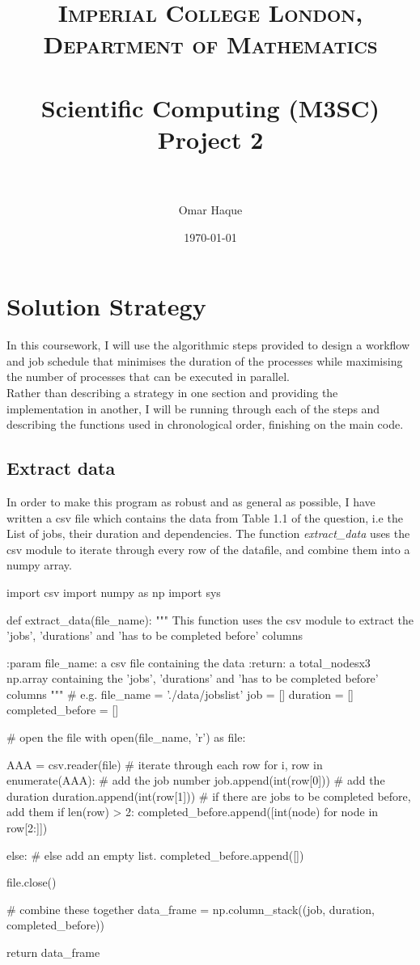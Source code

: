\documentclass[paper=a4, fontsize=12pt]{scrartcl} %
\title{
\normalfont \normalsize
\textsc{Imperial College London, Department of Mathematics} \\ [25pt]
\horrule{0.5pt} \\[0.4cm]                      %
\huge Scientific Computing (M3SC) Project 2 \\           %
\horrule{2pt} \\[0.5cm]                        %
}
\author{Omar Haque}
\date{\normalsize\today}
\numberwithin{equation}{section}       %
\numberwithin{figure}{section}         %
\numberwithin{table}{section}          %
\begin{document}

\maketitle

\section{Solution Strategy}

In this coursework, I will use the algorithmic steps provided to design a workflow and job schedule that minimises the duration of the processes while maximising the number of processes that can be executed in parallel. \\
Rather than describing a strategy in one section and providing the implementation in another, I will be running through each of the steps and describing the functions used in chronological order, finishing on the main code.
\subsection{Extract data}
In order to make this program as robust and as general as possible, I have written a csv file which contains the data from Table 1.1 of the question, i.e the List of jobs, their duration and dependencies.
The function \textit{extract\_data} uses the csv module to iterate through every row of the datafile, and combine them into a numpy array.

\begin{python} 
import csv
import numpy as np
import sys


def extract_data(file_name):
    """
    This function uses the csv module to extract the 'jobs', 'durations'
    and 'has to be completed before' columns

    :param file_name: a csv file containing the data
    :return: a total_nodesx3 np.array containing the 'jobs', 'durations'
    and 'has to be completed before' columns
    """
    # e.g. file_name = './data/jobslist'
    job = []
    duration = []
    completed_before = []

    # open the file
    with open(file_name, 'r') as file:

        AAA = csv.reader(file)
        # iterate through each row
        for i, row in enumerate(AAA):
            # add the job number
            job.append(int(row[0]))
            # add the duration
            duration.append(int(row[1]))
            # if there are jobs to be completed before, add them
            if len(row) > 2:
                completed_before.append([int(node) for node in row[2:]])

            else:
                # else add an empty list. 
                completed_before.append([])

    file.close()

    # combine these together
    data_frame = np.column_stack((job, duration, completed_before))

    return data_frame
    \end{python}
\end{document}
